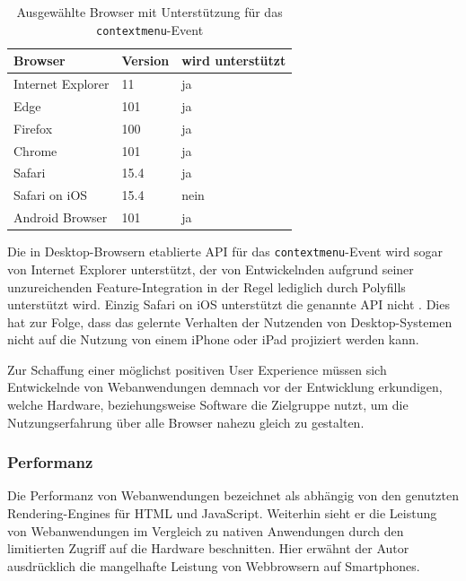 \documentclass[a4paper]{scrartcl}
\begin{document}
\begin{table}[H]
 	\caption{Ausgewählte Browser mit Unterstützung für das \texttt{contextmenu}-Event}
 	\begin{center}
 		\begin{tabularx}{\linewidth}{| Y | Y | Y |}
 			\hline
 			\textbf{Browser} & \textbf{Version} & \textbf{wird unterstützt} \\
 			\hline \hline
 			Internet Explorer & 11 & ja \\
 			\hline
 			Edge & 101 & ja \\
 			\hline
 			Firefox & 100 & ja \\
 			\hline
 			Chrome & 101 & ja \\
 			\hline
 			Safari & 15.4 & ja \\
 			\hline
 			Safari on iOS & 15.4 & nein \\
 			\hline
 			Android Browser & 101 & ja \\
 			\hline
 		\end{tabularx}
 	\end{center}
 	\justifying
	\small	
 	Die in Desktop-Browsern etablierte API für das \texttt{contextmenu}-Event wird sogar von Internet Explorer unterstützt, der von Entwickelnden aufgrund seiner unzureichenden Feature-Integration in der Regel lediglich durch Polyfills unterstützt wird. Einzig Safari on iOS unterstützt die genannte API nicht \autocite{contextmenu-event}. Dies hat zur Folge, dass das gelernte Verhalten der Nutzenden von Desktop-Systemen nicht auf die Nutzung von einem iPhone oder iPad projiziert werden kann.
 \end{table}
 
 Zur Schaffung einer möglichst positiven User Experience müssen sich Entwickelnde von Webanwendungen demnach vor der Entwicklung erkundigen, welche Hardware, beziehungsweise Software die Zielgruppe nutzt, um die Nutzungserfahrung über alle Browser nahezu gleich zu gestalten.

\subsubsection{Performanz}

Die Performanz von Webanwendungen bezeichnet \textcite[28]{Jobe} als abhängig von den genutzten Rendering-Engines für HTML und JavaScript. Weiterhin sieht er die Leistung von Webanwendungen im Vergleich zu nativen Anwendungen durch den limitierten Zugriff auf die Hardware beschnitten. Hier erwähnt der Autor ausdrücklich die mangelhafte Leistung von Webbrowsern auf Smartphones. \\
\end{document}
